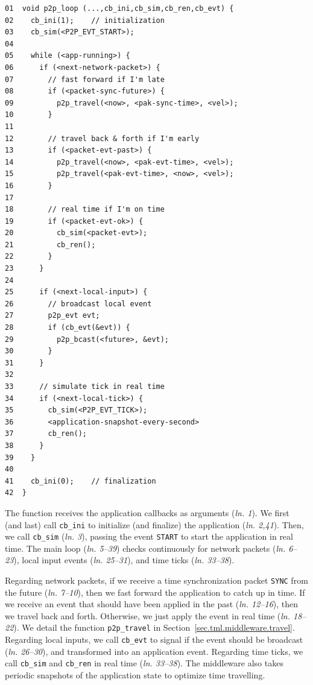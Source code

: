 \documentclass[12pt]{article}
\newcommand{\code}[1]  {\texttt{\small{#1}}}
\newcommand{\lin}[1]{(\emph{ln. #1}\xspace)}
\begin{document}
{\footnotesize
\begin{verbatim}
01  void p2p_loop (...,cb_ini,cb_sim,cb_ren,cb_evt) {
02    cb_ini(1);    // initialization
03    cb_sim(<P2P_EVT_START>);
04
05    while (<app-running>) {
06      if (<next-network-packet>) {
07        // fast forward if I'm late
08        if (<packet-sync-future>) {
09          p2p_travel(<now>, <pak-sync-time>, <vel>);
10        }
11
12        // travel back & forth if I'm early
13        if (<packet-evt-past>) {
14          p2p_travel(<now>, <pak-evt-time>, <vel>);
15          p2p_travel(<pak-evt-time>, <now>, <vel>);
16        }
17
18        // real time if I'm on time
19        if (<packet-evt-ok>) {
20          cb_sim(<packet-evt>);
21          cb_ren();
22        }
23      }
24
25      if (<next-local-input>) {
26        // broadcast local event
27        p2p_evt evt;
28        if (cb_evt(&evt)) {
29          p2p_bcast(<future>, &evt);
30        }
31      }
32
33      // simulate tick in real time
34      if (<next-local-tick>) {
35        cb_sim(<P2P_EVT_TICK>);
36        <application-snapshot-every-second>
37        cb_ren();
38      }
39    }
40
41    cb_ini(0);    // finalization
42  }
\end{verbatim}
}

The function receives the application callbacks as arguments \lin{1}.
We first (and last) call \code{cb\_ini} to initialize (and finalize) the
application \lin{2,41}.
Then, we call \code{cb\_sim} \lin{3}, passing the event \code{START} to start
the application in real time.
The main loop \lin{5--39} checks continuously for network packets \lin{6--23},
local input events \lin{25--31}, and time ticks \lin{33--38}.

Regarding network packets, if we receive a time synchronization packet
\code{SYNC} from the future \lin{7--10}, then we fast forward the application
to catch up in time. %
If we receive an event that should have been applied in the past \lin{12--16},
then we travel back and forth. %
Otherwise, we just apply the event in real time \lin{18--22}.
We detail the function \code{p2p\_travel} in
Section~\ref{sec.tml.middleware.travel}.
%
Regarding local inputs, we call \code{cb\_evt} to signal if the event should be
broadcast \lin{26--30}, and transformed into an application event.
%
Regarding time ticks, we call \code{cb\_sim} and \code{cb\_ren} in real time
\lin{33--38}.
The middleware also takes periodic snapshots of the application state to
optimize time travelling. %
\end{document}
